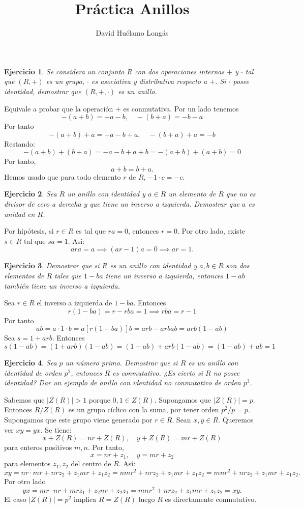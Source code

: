 \documentclass[11pt]{book}
\title{Práctica Anillos}
\author{David Huélamo Longás}
\newtheorem{ej}{Ejercicio}
\theoremstyle{definition}
\begin{document}
\begin{ej}
Se considera un conjunto $R$ con dos operaciones internas $+$ y $\cdot$ tal que $(R,+)$ es un grupo, $\cdot$ es asociativa y distributiva respecto a $+$. Si $\cdot$ posee identidad, demostrar que $(R,+,\cdot)$ es un anillo.
\end{ej}
\noindent Equivale a probar que la operación $+$ es conmutativa. Por un lado tenemos\[
-(a+b)=-a-b,\quad -(b+a)=-b-a
\]Por tanto\[
-(a+b)+a=-a-b+a,\quad -(b+a)+a=-b
\]Restando:\[
-(a+b)+(b+a)=-a-b+a+b=-(a+b)+(a+b)=0
\]Por tanto,\[
a+b=b+a.
\]Hemos usado que para todo elemento $r$ de $R$, $-1\cdot c=-c$.

\begin{ej}
Sea $R$ un anillo con identidad y $a\in R$ un elemento de $R$ que no es divisor de cero a derecha y que tiene un inverso a izquierda. Demostrar que $a$ es unidad en $R$.
\end{ej}
Por hipótesis, si $r\in R$ es tal que $ra=0$, entonces $r=0$. Por otro lado, existe $s\in R$ tal que $sa=1$. Así:\[
ara=a\implies (ar-1)a=0\implies ar=1.
\]

\begin{ej}
    Demostrar que si $R$ es un anillo con identidad y $a,b\in R$ son dos elementos de $R$ tales que $1-ba$ tiene un inverso a izquierda, entonces $1-ab$ también tiene un inverso a izquierda.
\end{ej}
\noindent Sea $r\in R$ el inverso a izquierda de $1-ba$. Entonces\[
r(1-ba)=r-rba=1\implies rba=r-1
\]Por tanto\[
ab = a\cdot 1\cdot b = a[r(1-ba)]b=arb-arbab=arb(1-ab)
\]Sea $s=1+arb$. Entonces\[
s(1-ab)=(1+arb)(1-ab)=(1-ab)+arb(1-ab)=(1-ab)+ab=1
\]

\begin{ej}
    Sea $p$ un número primo. Demostrar que si $R$ es un anillo con identidad de orden $p^2$, entonces $R$ es conmutativo. ¿Es cierto si $R$ no posee identidad? Dar un ejemplo de anillo con identidad no conmutativo de orden $p^3$.
\end{ej}
\noindent Sabemos que $|Z(R)|>1$ porque $0,1\in Z(R)$. Supongamos que $|Z(R)|=p$. Entonces $R/Z(R)$ es un grupo cíclico con la suma, por tener orden $p^2/p=p$. Supongamos que este grupo viene generado por $r\in R$. Sean $x,y\in R$. Queremos ver $xy=yx$. Se tiene:\[
x+Z(R)=nr+Z(R),\quad y+Z(R)=mr +Z(R)
\]para enteros positivos $m,n$. Por tanto,\[
    x=nr+z_1,\quad y=mr +z_2
\]para elementos $z_1,z_2$ del centro de $R$. Así:\[
xy=nr\cdot mr + nr z_2 + z_1mr +z_1z_2 =nmr^2+ nr z_2 + z_1mr +z_1z_2=mnr^2+ nr z_2 + z_1mr +z_1z_2.
\]Por otro lado\[
yx=mr\cdot nr + mrz_1 + z_2nr + z_2z_1=mnr^2+ nr z_2 + z_1mr +z_1z_2=xy.
\]El caso $|Z(R)|=p^2$ implica $R=Z(R)$ luego $R$ es directamente conmutativo.
\end{document}
